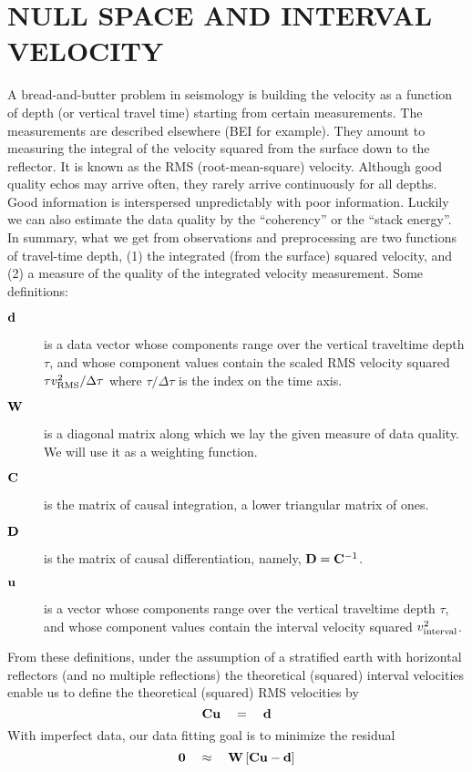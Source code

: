 \section{NULL SPACE AND INTERVAL VELOCITY}
A bread-and-butter problem in seismology is building the velocity
as a function of depth (or vertical travel time)
starting from certain measurements.
The measurements are described elsewhere (BEI for example).
They amount to measuring the integral of the velocity squared
from the surface down to the reflector.
It is known as the RMS (root-mean-square) velocity.
Although good quality echos may arrive often,
they rarely arrive continuously for all depths.
Good information is interspersed unpredictably with poor information.
Luckily we can
also estimate
the data quality by the ``coherency'' or the
``stack energy''.
In summary, what we get from observations and preprocessing
are two functions of travel-time depth,
(1) the integrated (from the surface) squared velocity, and
(2) a measure of the quality of the integrated velocity measurement.
Some definitions:
\begin{description}
\item  [$\bold d$]
is a data vector whose components range over the vertical
traveltime depth $\tau$,
and whose component values contain the scaled RMS velocity squared
$\tau v_{\rm RMS}^2/\Delta \tau $
where
$\tau /\Delta \tau $ is the index on the time axis.
\item [$\bold W$]
is a diagonal matrix along which we lay the given measure
of data quality.  We will use it as a weighting function.
\item  [$\bold C$]
is the matrix of causal integration, a lower triangular matrix of ones.
\item  [$\bold D$]
is the matrix of causal differentiation, namely, $\bold D=\bold C^{-1}$.
\item [$\bold u$]
is a vector whose components range over the vertical
traveltime depth $\tau$,
and whose component values contain the interval velocity squared
$v_{\rm interval}^2 $.
\end{description}
From these definitions,
under the assumption of a stratified earth with horizontal reflectors
(and no multiple reflections)
the theoretical (squared) interval velocities
enable us to define the theoretical (squared) RMS velocities by
\begin{equation}
\bold C\bold u \quad =\quad \bold d 
\end{equation}
With imperfect data, our data fitting goal is to minimize the residual
\begin{equation}
\bold 0
\quad\approx\quad
\bold W
\left[
\bold C\bold u
-
\bold d
\right]
\end{equation}
